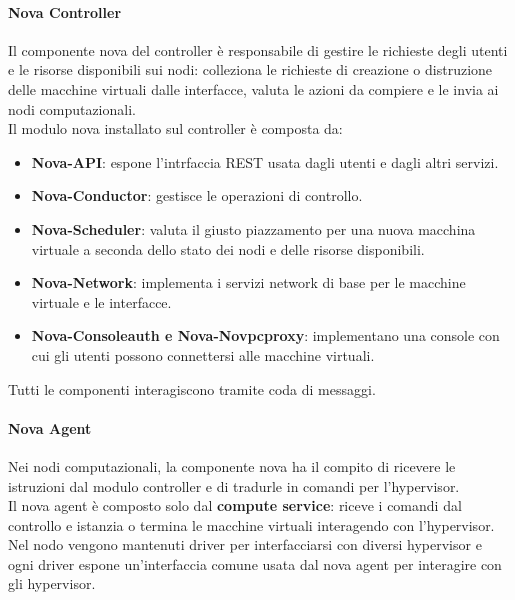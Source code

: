\documentclass{article}
\begin{document}
\paragraph{Nova Controller}
Il componente nova del controller è responsabile di gestire le richieste degli utenti e le risorse disponibili sui nodi: colleziona le richieste di creazione o distruzione delle macchine virtuali dalle interfacce, valuta le azioni da compiere e le invia ai nodi computazionali.\\
Il modulo nova installato sul controller è composta da:
\begin{itemize}
    \item \textbf{Nova-API}: espone l'intrfaccia REST usata dagli utenti e dagli altri servizi.
    \item \textbf{Nova-Conductor}: gestisce le operazioni di controllo.
    \item \textbf{Nova-Scheduler}: valuta il giusto piazzamento per una nuova macchina virtuale a seconda dello stato dei nodi e delle risorse disponibili.
    \item \textbf{Nova-Network}: implementa i servizi network di base per le macchine virtuale e le interfacce.
    \item \textbf{Nova-Consoleauth e Nova-Novpcproxy}: implementano una console con cui gli utenti possono connettersi alle macchine virtuali.
\end{itemize}
Tutti le componenti interagiscono tramite coda di messaggi.

\paragraph{Nova Agent}
Nei nodi computazionali, la componente nova ha il compito di ricevere le istruzioni dal modulo controller e di tradurle in comandi per l'hypervisor.\\
Il nova agent è composto solo dal \textbf{compute service}: riceve i comandi dal controllo e istanzia o termina le macchine virtuali interagendo con l'hypervisor.
Nel nodo vengono mantenuti driver per interfacciarsi con diversi hypervisor e ogni driver espone un'interfaccia comune usata dal nova agent per interagire con gli hypervisor.
\end{document}
